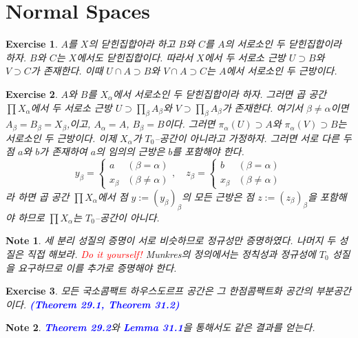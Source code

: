 \documentclass{article}
\newtheorem{exercise}{Exercise}[section]
\newtheorem*{note}{Note}
\begin{document}
\section{Normal Spaces}

\begin{exercise}
    $A$를 $X$의 닫힌집합아라 하고 $B$와 $C$를 $A$의 서로소인 두 닫힌집합이라 하자. $B$와 $C$는 $X$에서도 닫힌집합이다. 따라서 $X$에서 두 서로소 근방 $U\supset B$와 $V\supset C$가 존재한다. 이때 $U\cap A\supset B$와 $V\cap A\supset C$는 $A$에서 서로소인 두 근방이다.
\end{exercise}

\begin{exercise}
    $A$와 $B$를 $X_\alpha$에서 서로소인 두 닫힌집합이라 하자. 그러면 곱 공간 $\prod X_\alpha$에서 두 서로소 근방 $U\supset\prod_\beta A_\beta$와 $V\supset\prod_\beta A_\beta$가 존재한다. 여기서 $\beta\ne\alpha$이면 $A_\beta=B_\beta=X_\beta$,이고, $A_\alpha=A$, $B_\beta=B$이다. 그러면 $\pi_\alpha(U)\supset A$와 $\pi_\alpha(V)\supset B$는 서로소인 두 근방이다. 이제 $X_\alpha$가 $T_0$--공간이 아니라고 가정하자. 그러면 서로 다른 두 점 $a$와 $b$가 존재하여 $a$의 임의의 근방은 $b$를 포함해야 한다.
    \[
        y_\beta=\begin{cases}
            a & (\beta=\alpha)\\
            x_\beta & (\beta\ne\alpha)
        \end{cases},\quad
        z_\beta=\begin{cases}
            b & (\beta=\alpha)\\
            x_\beta & (\beta\ne\alpha)
        \end{cases}
    \]
    라 하면 곱 공간 $\prod X_\alpha$에서 점 $y:=(y_\beta)_\beta$의 모든 근방은 점 $z:=(z_\beta)_\beta$을 포함해야 하므로 $\prod X_\alpha$는 $T_0$--공간이 아니다.
\end{exercise}
\begin{note}
    세 분리 성질의 증명이 서로 비슷하므로 정규성만 증명하였다. 나머지 두 성질은 직접 해보라. \textcolor{red}{Do it yourself!} Munkres의 정의에서는 정칙성과 정규성에 $T_0$ 성질을 요구하므로 이를 추가로 증명해야 한다.
\end{note}

\begin{exercise}
    모든 국소콤팩트 하우스도르프 공간은 그 한점콤팩트화 공간의 부분공간이다. \textcolor{blue}{\textbf{(Theorem 29.1, Theorem 31.2)}}
\end{exercise}
\begin{note}
    \textcolor{blue}{\textbf{Theorem 29.2}}와 \textcolor{blue}{\textbf{Lemma 31.1}}을 통해서도 같은 결과를 얻는다.
\end{note}
\end{document}
